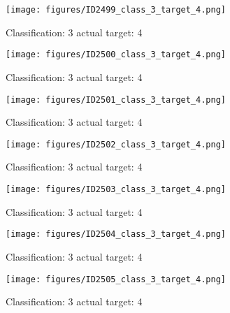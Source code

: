 \begin{figure}[h!]
\begin{center}
\texttt{[image: figures/ID2499\_class\_3\_target\_4.png]}
\end{center}
\caption{ Classification: 3 actual target: 4}
\label{fig:ID2499_class_3_target_4}
\end{figure}
\begin{figure}[h!]
\begin{center}
\texttt{[image: figures/ID2500\_class\_3\_target\_4.png]}
\end{center}
\caption{ Classification: 3 actual target: 4}
\label{fig:ID2500_class_3_target_4}
\end{figure}
\begin{figure}[h!]
\begin{center}
\texttt{[image: figures/ID2501\_class\_3\_target\_4.png]}
\end{center}
\caption{ Classification: 3 actual target: 4}
\label{fig:ID2501_class_3_target_4}
\end{figure}
\begin{figure}[h!]
\begin{center}
\texttt{[image: figures/ID2502\_class\_3\_target\_4.png]}
\end{center}
\caption{ Classification: 3 actual target: 4}
\label{fig:ID2502_class_3_target_4}
\end{figure}
\begin{figure}[h!]
\begin{center}
\texttt{[image: figures/ID2503\_class\_3\_target\_4.png]}
\end{center}
\caption{ Classification: 3 actual target: 4}
\label{fig:ID2503_class_3_target_4}
\end{figure}
\begin{figure}[h!]
\begin{center}
\texttt{[image: figures/ID2504\_class\_3\_target\_4.png]}
\end{center}
\caption{ Classification: 3 actual target: 4}
\label{fig:ID2504_class_3_target_4}
\end{figure}
\begin{figure}[h!]
\begin{center}
\texttt{[image: figures/ID2505\_class\_3\_target\_4.png]}
\end{center}
\caption{ Classification: 3 actual target: 4}
\label{fig:ID2505_class_3_target_4}
\end{figure}
